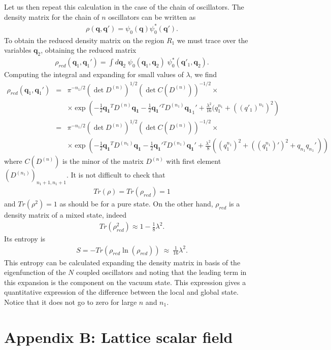 \documentclass[10pt, nofootinbib]{revtex4}
\newcommand{\bea}{\begin{eqnarray}}
\newcommand{\eea}{\end{eqnarray}}
\begin{document}
Let us then repeat this calculation in the case of the chain of
oscillators.  The density matrix for the chain of $n$ oscillators can
be written as
%
\bea
\rho(\mathbf q, \mathbf q') = \psi_0(\mathbf q) 
\psi^*_0( \mathbf q').
\eea
%
To obtain the reduced density matrix on the region $R_{1}$ we must
trace over the variables $\mathbf q_2$, obtaining the reduced
matrix
%
\bea
{\rho}_{red}(\mathbf q_1,\mathbf q_{1}') = \int 
d\mathbf q_2\;{\psi}_0(\mathbf q_1,\mathbf q_2) 
\;{\psi}^*_0(\mathbf q'_1,\mathbf q_2). 
\eea
%
Computing the integral and expanding for small values of $\lambda$, 
we find
%
\bea
{\rho}_{red}(\mathbf q_1,\mathbf q_{1}') &=& \pi^{-n_{1}/2} \left( \det 
D^{\scriptscriptstyle{(n)}}\right)^{1/2}\left(\det 
C(D^{\scriptscriptstyle{(n)}}) \right)^{-1/2} \times \\
&& \times \exp \left( -\frac{1}{2}\mathbf{q_1}^T 
D^{\scriptscriptstyle{(n)}} \mathbf{q_1}-\frac{1}{2}\mathbf{q_1}'{}^T 
D^{\scriptscriptstyle{(n_{1})}} 
\mathbf{q_1}_1'+\frac{\lambda^2}{16}(q_1^{n_1}+((q'_1)^{n_1})^2 \right) \nonumber\\
&=&\pi^{-n_{1}/2} \left( \det D^{\scriptscriptstyle{(n)}} 
\right)^{1/2}\left(\det C( D^{\scriptscriptstyle{(n)}}) 
\right)^{-1/2} \times \nonumber\\
&& \times \exp \left( -\frac{1}{2}\mathbf{q_1}^T
D^{\scriptscriptstyle{(n_{1})}} \mathbf{q_1}-\frac{1}{2}\mathbf{q_1}'{}^T
D^{\scriptscriptstyle{(n_{1})}}\mathbf{q_1}'+\frac{\lambda^2}{8}((q_1^{n_1})^2
+((q_1^{n_1})')^
2+q_{n_1} q_{n_1}') \right) \nonumber
\eea
%
where $C(D^{\scriptscriptstyle{(n)}})$ is the minor of the matrix 
$D^{\scriptscriptstyle{(n)}}$ with first element 
$(D^{\scriptscriptstyle{(n_{1})}})_{n_{1}+1,n_{1}+1}$. It is not difficult to 
check that 
%
\bea
Tr(\rho)= 
Tr({\rho}_{red})=1
\eea
%
and $Tr(\rho^2)=1$ as should be for a pure state.  On the other hand,
${\rho}_{red}$ is a density matrix of a mixed state, indeed
%
\bea
Tr({\rho}_{red}^2) \approx 1 - \frac{1}{8}\lambda^2.
\eea
%
Its entropy  is
%
\bea
S= -Tr \left( \rho_{red} \ln (\rho_{red}) \right)  
\ \approx\ \frac{1}{16} \lambda^2.
\eea
%
This entropy can be calculated expanding the density matrix in basis
of the eigenfunction of the $N$ coupled oscillators and noting that
the leading term in this expansion is the component on the vacuum
state.  This expression gives a quantitative expression of the
difference between the local and global state.  Notice that it does
not go to zero for large $n$ and $n_{1}$.

\section*{Appendix B: Lattice scalar field}
\end{document}
